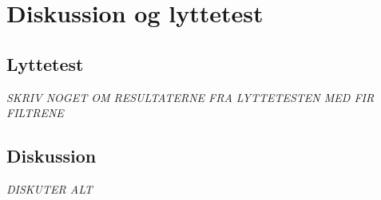 \section{Diskussion og lyttetest}

\subsection{Lyttetest}
\textit{SKRIV NOGET OM RESULTATERNE FRA LYTTETESTEN MED FIR FILTRENE}


\subsection{Diskussion}
\textit{DISKUTER ALT}
